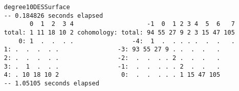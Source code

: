 \documentclass[twoside,12pt, leqno]{amsart}
\begin{document}
\begin{verbatim}
     degree10DESSurface
     -- 0.184826 seconds elapsed
            0  1  2  3 4                    -1  0  1 2 3 4  5  6   7
     total: 1 11 18 10 2 cohomology: total: 94 55 27 9 2 3 15 47 105
         0: 1  .  .  . .                -4:  1  .  . . . .  .  .   .
	 1: .  .  .  . .                -3: 93 55 27 9 . .  .  .   .
	 2: .  .  .  . .                -2:  .  .  . . 2 .  .  .   .
	 3: .  1  .  . .                -1:  .  .  . . . 2  .  .   .
	 4: . 10 18 10 2                 0:  .  .  . . . 1 15 47 105
     -- 1.05105 seconds elapsed
     
\end{verbatim}
\end{document}
